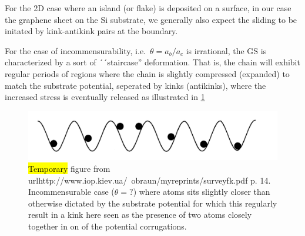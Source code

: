 For the 2D case where an island (or flake) is deposited on a surface, in our case the graphene sheet on the Si substrate, we generally also expect the sliding to be initated by kink-antikink pairs at the boundary. 

For the case of incommensurability, i.e.\ $\theta = a_b/a_c$ is irrational, the
\acrshort{GS} is characterized by a sort of ´´staircase'' deformation. That is, the chain will exhibit regular periods of regions where the chain is slightly compressed
(expanded) to match the substrate potential, seperated by kinks (antikinks),
where the increased stress is eventually released 
as illustrated in \cref{fig:incommensurable_example} 

\begin{figure}[H]
  \centering
  \includegraphics[width=0.5\linewidth]{figures/theory/incommensurable_example.png}
  \caption{\hl{Temporary} figure from
  url{http://www.iop.kiev.ua/~obraun/myreprints/surveyfk.pdf} p. 14.
  Incommensurable case ($\theta = ?$) where atoms sits slightly closer than
  otherwise dictated by the substrate potential for which this regularly result
  in a kink here seen as the presence of two atoms closely together in on of the
  potential corrugations.}
  \label{fig:incommensurable_example}
\end{figure}


